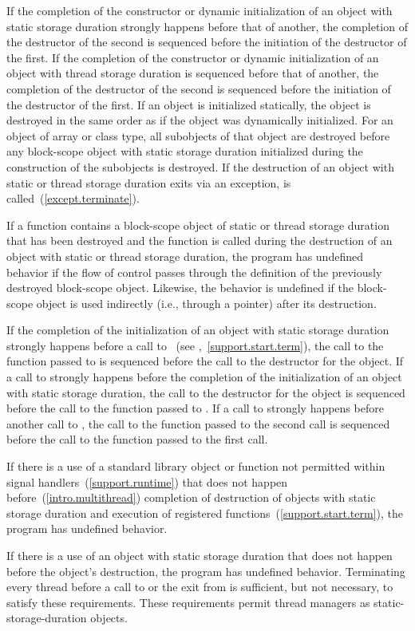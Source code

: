 \pnum
If the completion of the constructor or dynamic initialization of an object with static
storage duration strongly happens before that of another, the completion of the destructor
of the second is sequenced before the initiation of the destructor of the first.
If the completion of the constructor or dynamic initialization of an object with thread
storage duration is sequenced before that of another, the completion of the destructor
of the second is sequenced before the initiation of the destructor of the first.
If an object is
initialized statically, the object is destroyed in the same order as if
the object was dynamically initialized. For an object of array or class
type, all subobjects of that object are destroyed before any block-scope
object with static storage duration initialized during the construction
of the subobjects is destroyed.
If the destruction of an object with static or thread storage duration
exits via an exception,
 is called~(\ref{except.terminate}).

\pnum
If a function contains a block-scope object of static or thread storage duration that has been
destroyed and the function is called during the destruction of an object with static or
thread storage duration, the program has undefined behavior if the flow of control
passes through the definition of the previously destroyed block-scope object. Likewise, the
behavior is undefined if the block-scope object is used indirectly (i.e., through a
pointer) after its destruction.

\pnum
{}%
%
If the completion of the initialization of an object with static storage
duration strongly happens before a call to ~(see
,~\ref{support.start.term}), the call to the function passed to
 is sequenced before the call to the destructor for the object. If a
call to  strongly happens before the completion of the initialization of
an object with static storage duration, the call to the destructor for the
object is sequenced before the call to the function passed to . If a
call to  strongly happens before another call to , the
call to the function passed to the second  call is sequenced before
the call to the function passed to the first  call.

\pnum
If there is a use of a standard library object or function not permitted within signal
handlers~(\ref{support.runtime}) that does not happen before~(\ref{intro.multithread})
completion of destruction of objects with static storage duration and execution of
 registered functions~(\ref{support.start.term}), the program has
undefined behavior. \begin{note} If there is a use of an object with static storage
duration that does not happen before the object's destruction, the program has undefined
behavior. Terminating every thread before a call to  or the exit from
 is sufficient, but not necessary, to satisfy these requirements. These
requirements permit thread managers as static-storage-duration objects. \end{note}

